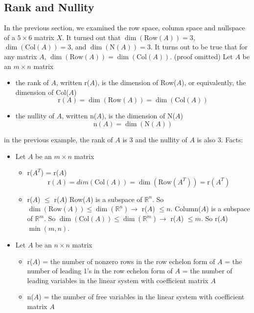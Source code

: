 \documentclass[12pt]{article}
\begin{document}
\subsection{Rank and Nullity} 
In the previous section, we examined the row space, column space and nullspace of a $5 \times 6$ matrix $X$. It turned out that $\dim(\text{Row}(A)) = 3$, $\dim(\text{Col}(A)) = 3$, and $\dim(\text{N}(A)) = 3$. It turns out to be true that for any matrix $A$, $\dim(\text{Row}(A)) = \dim(\text{Col}(A)) $. (proof omitted) \newline
Let $A$ be an $m \times n$ matrix \begin{itemize} \item the rank of $A$, written r($A$), is the dimension of Row($A$), or equivalently, the dimension of Col($A$) $$ \text{r}(A) = \dim(\text{Row}(A)) = \dim(\text{Col}(A)) $$ \item the nullity of $A$, written n($A$), is the dimension of N($A$) $$\text{n}(A) = \dim(\text{N}(A)) $$ \end{itemize} 
in the previous example, the rank of $A$ is 3 and the nullity of $A$ is also 3. \newline Facts: \begin{itemize} \item Let $A$ be an $m \times n$ matrix \begin{itemize} 
\item r($A^T$) = r($A$) $$ \text{r}(A) = dim(\text{Col}(A)) = \dim(\text{Row}(A^T)) = \text{r}(A^T) $$ \item r($A$) $\leq$ r($A$) \newline Row($A$) is a subspace of $\mathbb{R}^n$. So $\dim(\text{Row}(A)) \leq \dim(\mathbb{R}^n) \rightarrow $ r($A$) $\leq n$. Column($A$) is a subspace of $\mathbb{R}^m$. So $\dim(\text{Col}(A)) \leq \dim(\mathbb{R}^m) \rightarrow $ r($A$) $\leq m$. So r($A$) $\min(m, n)$. \end{itemize} \item Let $A$ be an $n \times n$ matrix \begin{itemize} \item r($A$) = the number of nonzero rows in the row echelon form of $A$ = the number of leading 1's in the row echelon form of $A$ = the number of leading variables in the linear system with coefficient matrix $A$ \item n($A$) = the number of free variables in the linear system with coefficient matrix $A$ \end{itemize} \end{itemize} 
\end{document}

